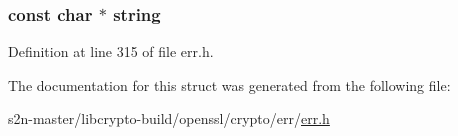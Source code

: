 \subsubsection[{\texorpdfstring{string}{string}}]{\setlength{\rightskip}{0pt plus 5cm}const char $\ast$ string}\hypertarget{struct_e_r_r__string__data__st_ad4c68ea99a26b0a98ad9a79982960458}{}\label{struct_e_r_r__string__data__st_ad4c68ea99a26b0a98ad9a79982960458}


Definition at line 315 of file err.\+h.



The documentation for this struct was generated from the following file\+:\begin{DoxyCompactItemize}
\item 
s2n-\/master/libcrypto-\/build/openssl/crypto/err/\hyperlink{crypto_2err_2err_8h}{err.\+h}\end{DoxyCompactItemize}
